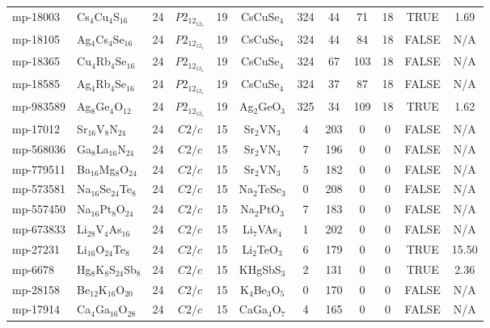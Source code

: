 {\begin{longtable}{llcccccccccc}
    mp-18003 & Cs$_{4}$Cu$_{4}$S$_{16}$ & 24    & $P2_12_12_1$ & 19    & CsCuSe$_{4}$ & 324   & 44    & 71    & 18    & TRUE  & 1.69  \\
    mp-18105 & Ag$_{4}$Cs$_{4}$Se$_{16}$ & 24    & $P2_12_12_1$ & 19    & CsCuSe$_{4}$ & 324   & 44    & 84    & 18    & FALSE & N/A \\
    mp-18365 & Cu$_{4}$Rb$_{4}$Se$_{16}$ & 24    & $P2_12_12_1$ & 19    & CsCuSe$_{4}$ & 324   & 67    & 103   & 18    & FALSE & N/A \\
    mp-18585 & Ag$_{4}$Rb$_{4}$Se$_{16}$ & 24    & $P2_12_12_1$ & 19    & CsCuSe$_{4}$ & 324   & 37    & 87    & 18    & FALSE & N/A \\
    mp-983589 & Ag$_{8}$Ge$_{4}$O$_{12}$ & 24    & $P2_12_12_1$ & 19    & Ag$_{2}$GeO$_{3}$ & 325   & 34    & 109   & 18    & TRUE  & 1.62  \\
    mp-17012 & Sr$_{16}$V$_{8}$N$_{24}$ & 24    & $C2/c$ & 15    & Sr$_{2}$VN$_{3}$ & 4     & 203   & 0     & 0     & FALSE & N/A \\
    mp-568036 & Ga$_{8}$La$_{16}$N$_{24}$ & 24    & $C2/c$ & 15    & Sr$_{2}$VN$_{3}$ & 7     & 196   & 0     & 0     & FALSE & N/A \\
    mp-779511 & Ba$_{16}$Mg$_{8}$O$_{24}$ & 24    & $C2/c$ & 15    & Sr$_{2}$VN$_{3}$ & 5     & 182   & 0     & 0     & FALSE & N/A \\
    mp-573581 & Na$_{16}$Se$_{24}$Te$_{8}$ & 24    & $C2/c$ & 15    & Na$_{2}$TeSe$_{3}$ & 0     & 208   & 0     & 0     & FALSE & N/A \\
    mp-557450 & Na$_{16}$Pt$_{8}$O$_{24}$ & 24    & $C2/c$ & 15    & Na$_{2}$PtO$_{3}$ & 7     & 183   & 0     & 0     & FALSE & N/A \\
    mp-673833 & Li$_{28}$V$_{4}$As$_{16}$ & 24    & $C2/c$ & 15    & Li$_{7}$VAs$_{4}$ & 1     & 202   & 0     & 0     & FALSE & N/A \\
    mp-27231 & Li$_{16}$O$_{24}$Te$_{8}$ & 24    & $C2/c$ & 15    & Li$_{2}$TeO$_{3}$ & 6     & 179   & 0     & 0     & TRUE  & 15.50  \\
    mp-6678 & Hg$_{8}$K$_{8}$S$_{24}$Sb$_{8}$ & 24    & $C2/c$ & 15    & KHgSbS$_{3}$ & 2     & 131   & 0     & 0     & TRUE  & 2.36  \\
    mp-28158 & Be$_{12}$K$_{16}$O$_{20}$ & 24    & $C2/c$ & 15    & K$_{4}$Be$_{3}$O$_{5}$ & 0     & 170   & 0     & 0     & FALSE & N/A \\
    mp-17914 & Ca$_{4}$Ga$_{16}$O$_{28}$ & 24    & $C2/c$ & 15    & CaGa$_{4}$O$_{7}$ & 4     & 165   & 0     & 0     & FALSE & N/A \\

\end{longtable}}
